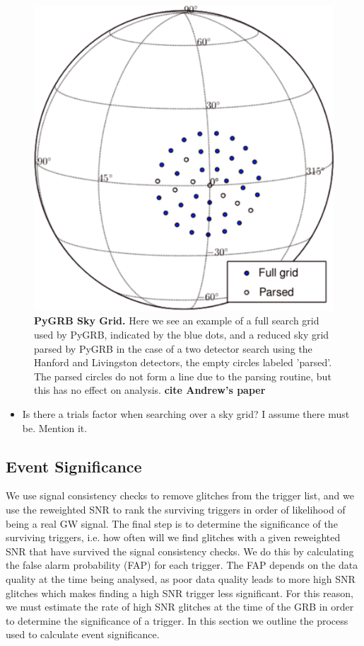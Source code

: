 \documentclass[11pt]{cuthesis}
\begin{document}
\begin{figure} %
\begin{center}
\includegraphics[width=0.6\linewidth]{skypatch.png}
\end{center}
\caption{\textbf{PyGRB Sky Grid.} Here we see an example of a full search grid used by PyGRB, indicated by the blue dots, and a reduced sky grid parsed by PyGRB in the case of a two detector search using the Hanford and Livingston detectors, the empty circles labeled 'parsed'. The parsed circles do not form a line due to the parsing routine, but this has no effect on analysis. \textbf{cite Andrew's paper}}
\label{fig:skypatch}
\end{figure}

\begin{itemize}
\item Is there a trials factor when searching over a sky grid? I assume there must be. Mention it. 
\end{itemize}


\subsection{Event Significance}
We use signal consistency checks to remove glitches from the trigger list, and we use the reweighted SNR to rank the surviving triggers in order of likelihood of being a real GW signal. The final step is to determine the significance of the surviving triggers, i.e. how often will we find glitches with a given reweighted SNR that have survived the signal consistency checks. We do this by calculating the false alarm probability (FAP) for each trigger. The FAP depends on the data quality at the time being analysed, as poor data quality leads to more high SNR glitches which makes finding a high SNR trigger less significant. For this reason, we must estimate the rate of high SNR glitches at the time of the GRB in order to determine the significance of a trigger. In this section we outline the process used to calculate event significance. 
\end{document}
